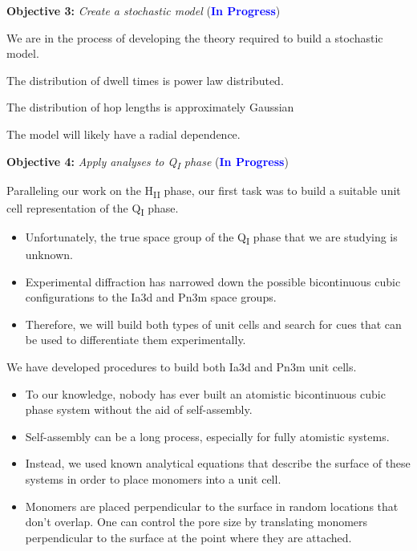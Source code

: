 \documentclass{article}
\begin{document}
  \noindent \textbf{\large Objective 3:} \textit{\large Create a stochastic model} (\textcolor{blue}{\textbf{In Progress}})
  
  \noindent We are in the process of developing the theory required to build a 
  stochastic model. 
  
  \noindent The distribution of dwell times is power law distributed.
  
  \noindent The distribution of hop lengths is approximately Gaussian
  
  \noindent The model will likely have a radial dependence. 
  
  \noindent \textbf{\large Objective 4:} \textit{\large Apply analyses to Q\textsubscript{I} phase} (\textcolor{blue}{\textbf{In Progress}})
  
  Paralleling our work on the H\textsubscript{II} phase, our first task was to
  build a suitable unit cell representation of the Q\textsubscript{I} phase. 
  \begin{itemize}
    \item Unfortunately, the true space group of the Q\textsubscript{I}
    phase that we are studying is unknown. 
    \item Experimental diffraction has narrowed down the possible bicontinuous
    cubic configurations to the Ia3d and Pn3m space groups. 
    \item Therefore, we will build both types of unit cells and search for
    cues that can be used to differentiate them experimentally.
  \end{itemize}  
  
  \noindent We have developed procedures to build both Ia3d and Pn3m unit
  cells.
  \begin{itemize}
    \item To our knowledge, nobody has ever built an atomistic bicontinuous
    cubic phase system without the aid of self-assembly.
    \item Self-assembly can be a long process, especially for fully atomistic
    systems. 
    \item Instead, we used known analytical equations that describe the 
    surface of these systems in order to place monomers into a unit cell.
    \item Monomers are placed perpendicular to the surface in random locations
    that don't overlap. One can control the pore size by translating monomers 
    perpendicular to the surface at the point where they are attached.
  \end{itemize}
  
\end{document}
